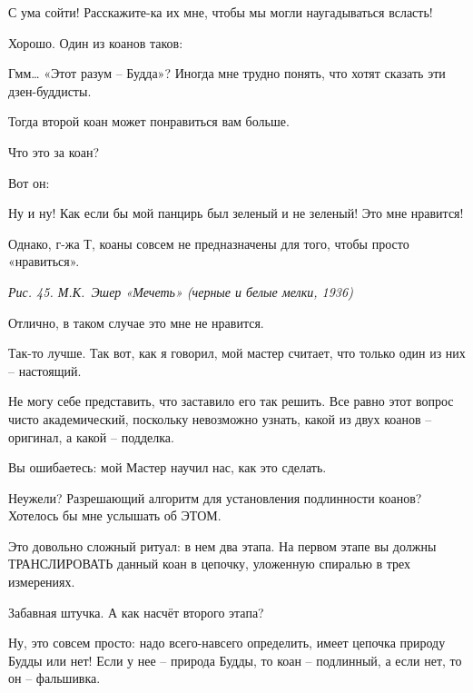 \documentclass[../main.tex]{subfiles}
\begin{document}
\begin{dialogue}
 С ума сойти! Расскажите-ка их мне, чтобы мы могли наугадываться всласть!

 Хорошо. Один из коанов таков:


 Гмм\ldots{} «Этот разум \--- Будда»? Иногда мне трудно понять, что хотят сказать эти дзен-буддисты.

 Тогда второй коан может понравиться вам больше.

 Что это за коан?

 Вот он:


 Ну и ну! Как если бы мой панцирь был зеленый и не зеленый! Это мне нравится!

 Однако, г-жа Т, коаны совсем не предназначены для того, чтобы просто «нравиться».

\emph{Рис. 45. М.К.~Эшер «Мечеть» (черные и белые мелки, 1936)}

 Отлично, в таком случае это мне не нравится.

 Так-то лучше. Так вот, как я говорил, мой мастер считает, что только один из них \--- настоящий.

 Не могу себе представить, что заставило его так решить. Все равно этот вопрос чисто академический, поскольку невозможно узнать, какой из двух коанов \--- оригинал, а какой \--- подделка.

 Вы ошибаетесь: мой Мастер научил нас, как это сделать.

 Неужели? Разрешающий алгоритм для установления подлинности коанов? Хотелось бы мне услышать об ЭТОМ.

 Это довольно сложный ритуал: в нем два этапа. На первом этапе вы должны ТРАНСЛИРОВАТЬ данный коан в цепочку, уложенную спиралью в трех измерениях.

 Забавная штучка. А как насчёт второго этапа?

 Ну, это совсем просто: надо всего-навсего определить, имеет цепочка природу Будды или нет! Если у нее \--- природа Будды, то коан \--- подлинный, а если нет, то он \--- фальшивка.


\end{dialogue}
\end{document}
